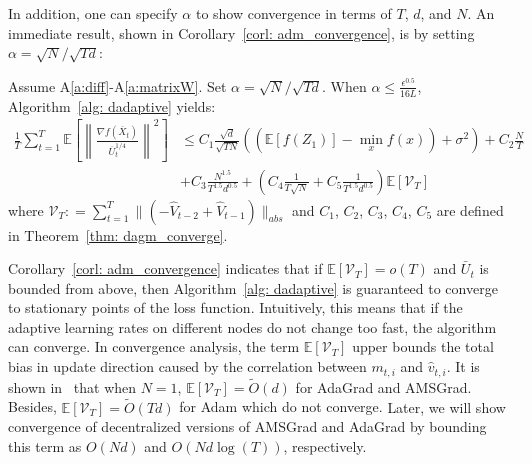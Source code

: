 \documentclass[11pt]{article}
\begin{document}
In addition, one can specify $\alpha$ to show convergence in terms of $T$, $d$, and $N$. 
An immediate result, shown in Corollary~\ref{corl: adm_convergence}, is by setting $\alpha = \sqrt{N}/\sqrt{Td}$:
\begin{corollary}\label{corl: adm_convergence}
Assume A\ref{a:diff}-A\ref{a:matrixW}. Set $\alpha = \sqrt{N}/\sqrt{Td}$.
When $\alpha  \leq \frac{\epsilon^{0.5}}{16L} $, Algorithm~\ref{alg: dadaptive} yields:
 {\small
	\begin{align}\label{eq: thm1}
	\frac{1}{T}\sum_{t=1}^T  \mathbb E \left [\left\|\frac{\nabla f( \overline X_{t})}{\overline U_{t}^{1/4}}\right\|^2  \right]
&	\leq   C_1 \frac{\sqrt{d}}{\sqrt{TN}} \left(( \mathbb E  [f( Z_{1})]  -  \min_x  f(x)) +    \sigma^2 \right)  +  C_2 \frac{N}{T} \nonumber \\
	&+  C_3 \frac{N^{1.5}}{T^{1.5}d^{0.5}} 
    +  \left(C_4 \frac{1}{T\sqrt{N}} +  C_5   \frac{1}{T^{1.5}d^{0.5}}\right) \mathbb E \left[\mathcal V_T \right] 
	\end{align}
	}
	where $ \mathcal{V}_T : = \sum_{t=1}^{T}   \|    (- \hat V_{t-2} + \hat V_{t-1} ) \|_{abs}$ and $C_1$, $C_2$, $C_3$, $C_4$,  $C_5$ are defined in Theorem~\ref{thm: dagm_converge}.
\end{corollary}
Corollary~\ref{corl: adm_convergence} indicates that if  $\mathbb E [\mathcal{V}_T  ]  = o(T)$ and $\bar U_t$ is bounded from above, then Algorithm~\ref{alg: dadaptive} is guaranteed to converge to stationary points of the loss function. 
Intuitively, this means that if the adaptive learning rates on different nodes do not change too fast, the algorithm can converge. In convergence analysis, the term $  \mathbb E [\mathcal{V}_T  ] $ upper bounds the total bias in update direction caused by the correlation between $m_{t,i}$ and $\hat v_{t,i}$.
It is shown in~\cite{chen2018convergence} that when $N=1$, $  \mathbb E [\mathcal{V}_T  ]  = \tilde O (d) $ for AdaGrad and AMSGrad. Besides, $\mathbb E [\mathcal{V}_T  ]  = \tilde O (Td) $ for Adam which do not converge.  {Later, we will show convergence of decentralized versions of AMSGrad and AdaGrad by bounding this term as $O(Nd)$ and $O(Nd \log (T))$, respectively.}
\end{document}
